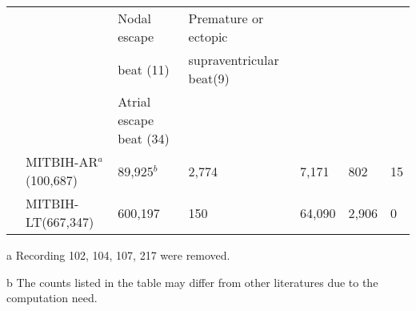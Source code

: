 \documentclass{bmcart}
\begin{document}
\begin{sidewaystable}
\begin{center}
\begin{threeparttable}
\begin{tabular}{cllllll}
&                     & Nodal escape  & Premature or ectopic & 	     &  &                          \\
&                     & beat (11)	  & supraventricular beat(9) &     &   &     \\

&                     & Atrial escape beat (34)   &  	  				      & 				            & 			      &                          \\
\hline
& MITBIH-AR$^a$(100,687) & 89,925$^b$   & 2,774   & 7,171   & 802    & 15        \\
& MITBIH-LT(667,347) & 600,197  &  150  & 64,090  & 	2,906   & 0       \\

\hline
\end{tabular}
\begin{tablenotes}
\item [a] Recording 102, 104, 107, 217 were removed.
\item [b] The counts listed in the table may differ from other literatures \cite{chaza} due to the computation need.
\end{tablenotes}
\end{threeparttable}

\end{center}

\end{sidewaystable}
\end{document}
